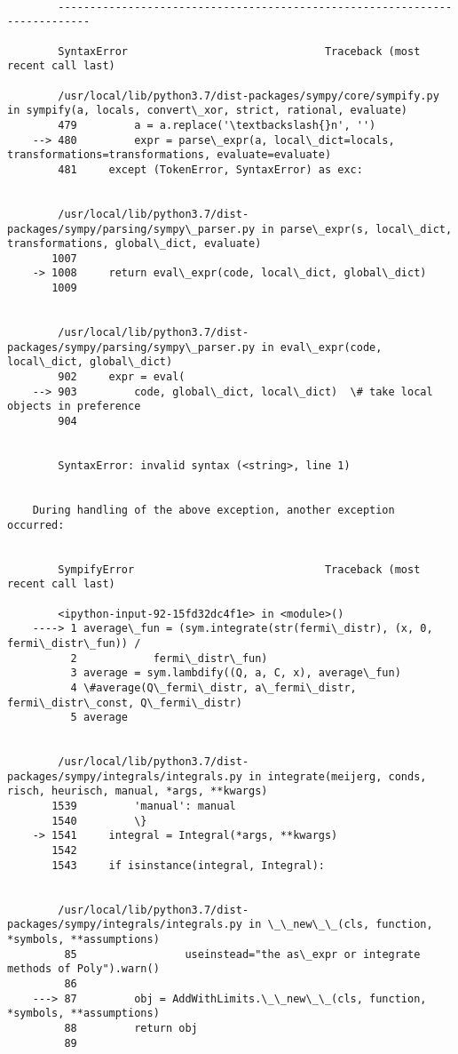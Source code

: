 \documentclass[11pt]{article}
\begin{document}
    \begin{Verbatim}[commandchars=\\\{\}]

        ---------------------------------------------------------------------------

        SyntaxError                               Traceback (most recent call last)

        /usr/local/lib/python3.7/dist-packages/sympy/core/sympify.py in sympify(a, locals, convert\_xor, strict, rational, evaluate)
        479         a = a.replace('\textbackslash{}n', '')
    --> 480         expr = parse\_expr(a, local\_dict=locals, transformations=transformations, evaluate=evaluate)
        481     except (TokenError, SyntaxError) as exc:


        /usr/local/lib/python3.7/dist-packages/sympy/parsing/sympy\_parser.py in parse\_expr(s, local\_dict, transformations, global\_dict, evaluate)
       1007 
    -> 1008     return eval\_expr(code, local\_dict, global\_dict)
       1009 


        /usr/local/lib/python3.7/dist-packages/sympy/parsing/sympy\_parser.py in eval\_expr(code, local\_dict, global\_dict)
        902     expr = eval(
    --> 903         code, global\_dict, local\_dict)  \# take local objects in preference
        904 


        SyntaxError: invalid syntax (<string>, line 1)

        
    During handling of the above exception, another exception occurred:


        SympifyError                              Traceback (most recent call last)

        <ipython-input-92-15fd32dc4f1e> in <module>()
    ----> 1 average\_fun = (sym.integrate(str(fermi\_distr), (x, 0, fermi\_distr\_fun)) / 
          2            fermi\_distr\_fun)
          3 average = sym.lambdify((Q, a, C, x), average\_fun)
          4 \#average(Q\_fermi\_distr, a\_fermi\_distr, fermi\_distr\_const, Q\_fermi\_distr)
          5 average


        /usr/local/lib/python3.7/dist-packages/sympy/integrals/integrals.py in integrate(meijerg, conds, risch, heurisch, manual, *args, **kwargs)
       1539         'manual': manual
       1540         \}
    -> 1541     integral = Integral(*args, **kwargs)
       1542 
       1543     if isinstance(integral, Integral):


        /usr/local/lib/python3.7/dist-packages/sympy/integrals/integrals.py in \_\_new\_\_(cls, function, *symbols, **assumptions)
         85                 useinstead="the as\_expr or integrate methods of Poly").warn()
         86 
    ---> 87         obj = AddWithLimits.\_\_new\_\_(cls, function, *symbols, **assumptions)
         88         return obj
         89 



\end{Verbatim}
\end{document}
